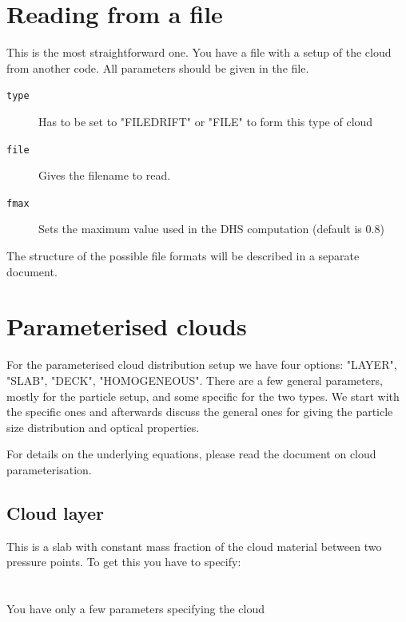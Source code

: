 \documentclass[12pt]{article}
\begin{document}
\section{Reading from a file}

This is the most straightforward one. You have a file with a setup of the cloud from another code. All parameters should be given in the file.

\begin{description}
\item[\texttt{type}]
Has to be set to "FILEDRIFT" or "FILE" to form this type of cloud
\item[\texttt{file}]
Gives the filename to read.
\item[\texttt{fmax}]
Sets the maximum value used in the DHS computation (default is 0.8)
\end{description}
The structure of the possible file formats will be described in a separate document.

\section{Parameterised clouds}

For the parameterised cloud distribution setup we have four options: "LAYER", "SLAB", "DECK", "HOMOGENEOUS".
There are a few general parameters, mostly for the particle setup, and some specific for the two types. We start with the specific ones and afterwards discuss the general ones for giving the particle size distribution and optical properties.

For details on the underlying equations, please read the document on cloud parameterisation.

\subsection{Cloud layer}

This is a slab with constant mass fraction of the cloud material between two pressure points. To get this you have to specify:
\\
\\
\\
You have only a few parameters specifying the cloud
\end{document}
